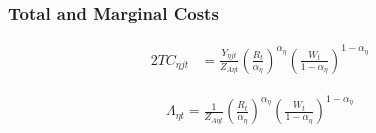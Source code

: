 \documentclass[
	12pt,
	]{article}
\numberwithin{equation}{section}
\theoremstyle{definition}
\theoremstyle{plain}
\theoremstyle{plain}
\theoremstyle{plain}
\begin{document}

\subsubsection*{Total and Marginal Costs}

\begin{alignat}{2}
	TC_{\eta jt} & = \frac{Y_{\eta jt}}{Z_{A\eta t}} \left( \frac{R_t}{\alpha_\eta} \right)^{\alpha_\eta} \left( \frac{W_t}{1-{\alpha_\eta}} \right)^{1-{\alpha_\eta}} \label{eq:int-good-firm-TC}
\end{alignat}



\begin{align}
	\label{eq:int-good-firm-MC-2}
	\Lambda_{\eta t} = \frac{1}{Z_{A\eta t}} \left( \frac{R_t}{\alpha_\eta} \right)^{\alpha_\eta} \left( \frac{W_t}{1-{\alpha_\eta}} \right)^{1-{\alpha_\eta}}
\end{align}

\end{document}
